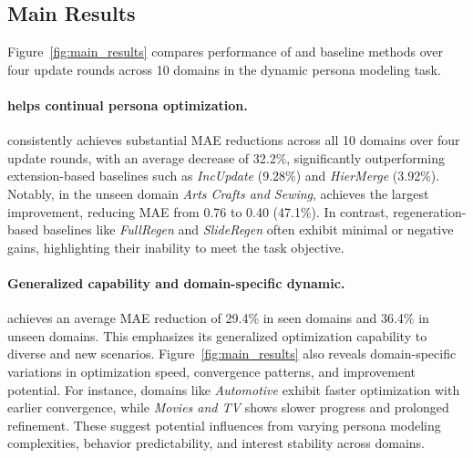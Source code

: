 \subsection{Main Results}
Figure~\ref{fig:main_results} compares performance of \method and baseline methods over four update rounds across 10 domains in the dynamic persona modeling task.




\paragraph{\method helps continual persona optimization.}  
\method consistently achieves substantial MAE reductions across all 10 domains over four update rounds, with an average decrease of 32.2\%, significantly outperforming extension-based baselines such as \textit{IncUpdate} (9.28\%) and \textit{HierMerge} (3.92\%). Notably, in the unseen domain \textit{Arts Crafts and Sewing}, \method achieves the largest improvement, reducing MAE from 0.76 to 0.40 (47.1\%). In contrast, regeneration-based baselines like \textit{FullRegen} and \textit{SlideRegen} often exhibit minimal or negative gains, highlighting their inability to meet the task objective.

\paragraph{Generalized capability and domain-specific dynamic.}
\method achieves an average MAE reduction of 29.4\% in seen domains and 36.4\% in unseen domains. This emphasizes its generalized optimization capability to diverse and new scenarios. Figure~\ref{fig:main_results} also reveals domain-specific variations in optimization speed, convergence patterns, and improvement potential. For instance, domains like \textit{Automotive} exhibit faster optimization with earlier convergence, while \textit{Movies and TV} shows slower progress and prolonged refinement. These suggest potential influences from varying persona modeling complexities, behavior predictability, and interest stability across domains. 




